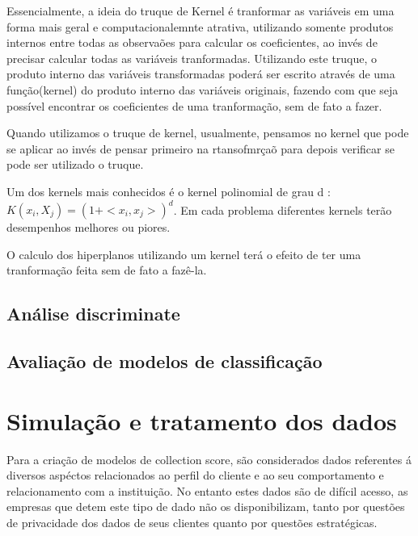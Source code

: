 \documentclass[12pt,a4paper]{article}
\begin{document}
Essencialmente, a ideia do truque de Kernel é tranformar as variáveis em uma forma mais geral e computacionalemnte atrativa, utilizando somente produtos internos entre todas as observaões para calcular os coeficientes, ao invés de precisar calcular todas as variáveis tranformadas. Utilizando este truque, o produto interno das variáveis transformadas poderá ser escrito através de uma função(kernel) do produto interno das variáveis originais, fazendo com que seja possível encontrar os coeficientes de uma tranformação, sem de fato a fazer.

Quando utilizamos o truque de kernel, usualmente, pensamos no kernel que pode se aplicar ao invés de pensar primeiro na rtansofmrçaõ para depois verificar se pode ser utilizado o truque.

Um dos kernels mais conhecidos é o kernel polinomial de grau d : $K(x_i,X_j) = (1 + <x_i,x_j>)^d$. Em cada problema diferentes kernels terão desempenhos melhores ou piores.

O calculo dos hiperplanos utilizando um kernel terá o efeito de ter uma tranformação feita sem de fato a fazê-la.


\subsection{Análise discriminate}


\subsection{Avaliação de modelos de classificação}

   


\section{Simulação e tratamento dos dados} %
Para a criação de modelos de collection score, são considerados dados referentes á diversos aspéctos relacionados ao perfil do cliente e ao seu comportamento e relacionamento com a instituição. No entanto estes dados são de difícil acesso, as empresas que detem este tipo de dado não os disponibilizam, tanto por questões de privacidade dos dados de seus clientes quanto por questões estratégicas.
\end{document}
